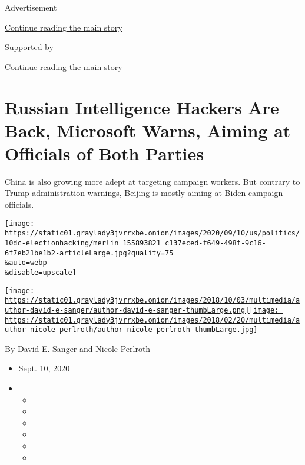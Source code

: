 Advertisement

\protect\hyperlink{after-top}{Continue reading the main story}

Supported by

\protect\hyperlink{after-sponsor}{Continue reading the main story}

\hypertarget{russian-intelligence-hackers-are-back-microsoft-warns-aiming-at-officials-of-both-parties}{%
\section{Russian Intelligence Hackers Are Back, Microsoft Warns, Aiming
at Officials of Both
Parties}\label{russian-intelligence-hackers-are-back-microsoft-warns-aiming-at-officials-of-both-parties}}

China is also growing more adept at targeting campaign workers. But
contrary to Trump administration warnings, Beijing is mostly aiming at
Biden campaign officials.

\texttt{[image: https://static01.graylady3jvrrxbe.onion/images/2020/09/10/us/politics/10dc-electionhacking/merlin\_155893821\_c137eced-f649-498f-9c16-6f7eb21be1b2-articleLarge.jpg?quality=75\\\&auto=webp\\\&disable=upscale]}

\href{https://www.nytimes3xbfgragh.onion/by/david-e-sanger}{\texttt{[image: https://static01.graylady3jvrrxbe.onion/images/2018/10/03/multimedia/author-david-e-sanger/author-david-e-sanger-thumbLarge.png]}}\href{https://www.nytimes3xbfgragh.onion/by/nicole-perlroth}{\texttt{[image: https://static01.graylady3jvrrxbe.onion/images/2018/02/20/multimedia/author-nicole-perlroth/author-nicole-perlroth-thumbLarge.jpg]}}

By \href{https://www.nytimes3xbfgragh.onion/by/david-e-sanger}{David E.
Sanger} and
\href{https://www.nytimes3xbfgragh.onion/by/nicole-perlroth}{Nicole
Perlroth}

\begin{itemize}
\item
  Sept. 10, 2020
\item
  \begin{itemize}
  \item
  \item
  \item
  \item
  \item
  \item
  \end{itemize}
\end{itemize}

